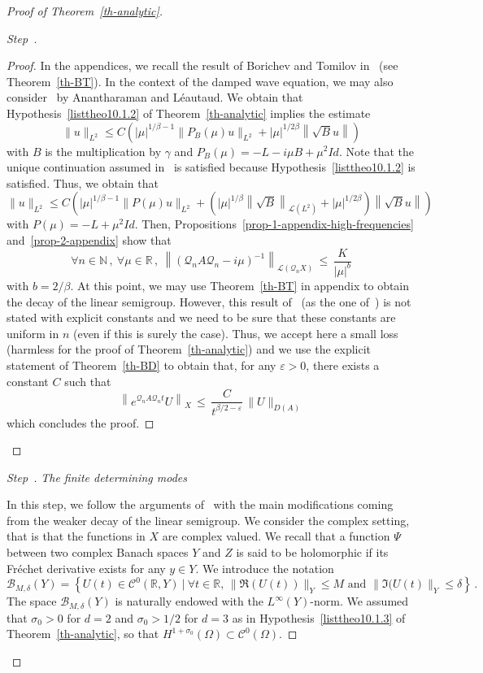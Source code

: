 \documentclass[AHL,Unicode,longabstracts]{cedram}
\newcommand{\RR}{\mathbb{R}}
\newcommand{\NN}{\mathbb{N}}
\newcommand{\Cc}{\mathcal{C}}
\newcommand{\Bc}{\mathcal{B}}
\newcommand{\Lc}{\mathcal{L}}
\newcommand{\Qc}{\mathcal{Q}}
\newcounter{stepcount}
\newenvironment{step}{\refstepcounter{stepcount}\begin{proof}[Step~\thestepcount]}{\let\qed\relax\end{proof}}
\let\oldforall\forall
\renewcommand*{\forall}{\mathrel{\oldforall}}
\begin{document}
\begin{proof}[{Proof of Theorem~\ref{th-analytic}}]
\begin{step}
\begin{proof}
In the appendices, we recall the result of Borichev and Tomilov in~\cite{Bor-Tom} (see Theorem~\ref{th-BT}). In the context of the damped wave equation, we may also consider~\cite[Proposition~2.4]{Ana-Leau} by Anantharaman and Léautaud. We obtain that Hypothesis~\eqref{listtheo10.1.2} of Theorem~\ref{th-analytic} implies the estimate
\begin{equation}
\|u\|_{L^2}\leq C \left(|\mu|^{1/\beta-1} \|P_B(\mu)u\|_{L^2} + |\mu|^{1/2\beta} \left\|\sqrt{B} u \right\| \right)
\end{equation}
with $B$ is the multiplication by $\gamma$ and $P_B(\mu)=-L-i\mu B+\mu^2 Id$. Note that the unique continuation assumed in~\cite[Proposition~2.4]{Ana-Leau} is satisfied because Hypothesis~\eqref{listtheo10.1.2} is satisfied. Thus, we obtain that
\begin{equation}\label{eq-demo-analytic-1}
\|u\|_{L^2}\leq C \left(|\mu|^{1/\beta-1} \|P(\mu)u\|_{L^2} +
\left(|\mu|^{1/\beta} \left\|\sqrt{B}\right\|_{\Lc(L^2)} + |\mu|^{1/2\beta}\right)
\left\|\sqrt{B} u\right\| \right)
\end{equation}
with $P(\mu)=-L+\mu^2 Id$. Then, Propositions~\ref{prop-1-appendix-high-frequencies} and~\ref{prop-2-appendix} show that
\[
\forall n\in\NN\,,\:\forall \mu\in\RR\,,\:\left\|(\Qc_n A \Qc_n -
i\mu)^{-1}\right\|_{\Lc(\Qc_n X)}\,\leq\,\frac K{|\mu|^b}
\]
with $b=2/\beta$. At this point, we may use Theorem~\ref{th-BT} in appendix to obtain the decay of the linear semigroup. However, this result of~\cite{Bor-Tom} (as the one of~\cite{Ana-Leau}) is not stated with explicit constants and we need to be sure that these constants are uniform in $n$ (even if this is surely the case). Thus, we accept here a small loss (harmless for the proof of Theorem~\ref{th-analytic}) and we use the explicit statement of Theorem~\ref{th-BD} to obtain that, for any $\varepsilon>0$, there exists a constant $C$ such that
\[
\left\|e^{\Qc_nA\Qc_n t} U\right\|_{X}\,\leq\,\frac C
{t^{\beta/2-\varepsilon}}
\, \|U\|_{D(A)}
\]
which concludes the proof.
\end{proof}
\end{step}

\begin{step}\emph{The finite determining modes\label{step3prooftheo10.1}}

In this step, we follow the arguments of~\cite{Hale-Raugel} with the main modifications coming from the weaker decay of the linear semigroup. We consider the complex setting, that is that the functions in $X$ are complex valued. We recall that a function $\Psi$ between two complex Banach spaces $Y$ and $Z$ is said to be holomorphic if its Fréchet derivative exists for any $y\in Y$. We introduce the notation
\[
\Bc_{M,\delta}(Y) = \left\{U(t)\in \Cc^0(\RR,Y)\:|\:\forall
t\in\RR,\,\|\Re(U(t))\|_Y\leq M\text{ and }\|\Im(U(t)\|_Y \leq \delta \right\}\,.
\]
The space $\Bc_{M,\delta}(Y)$ is naturally endowed with the $L^\infty(Y)$-norm. We assumed that $\sigma_0>0$ for $d=2$ and $\sigma_0>1/2$ for $d=3$ as in Hypothesis~\eqref{listtheo10.1.3} of Theorem~\ref{th-analytic}, so that $H^{1+\sigma_0}(\Omega)\subset \Cc^0(\Omega)$.


\end{step}
\end{proof}
\end{document}

